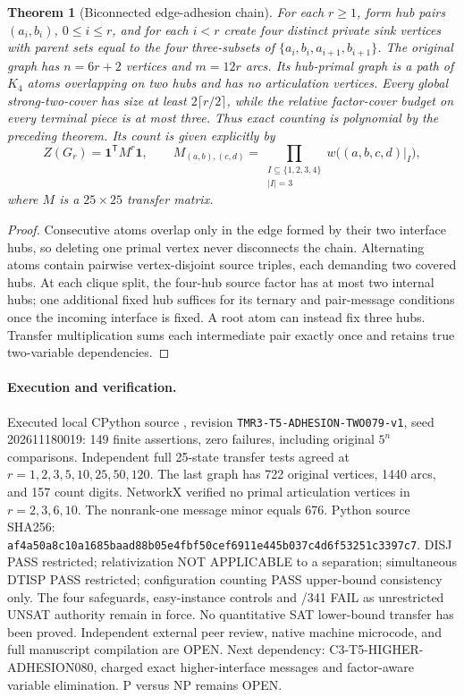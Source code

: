 \documentclass[11pt]{article}
\newtheorem{theorem}{Theorem}
\begin{document}
\begin{theorem}[Biconnected edge-adhesion chain]
For each $r\ge1$, form hub pairs $(a_i,b_i)$,
$0\le i\le r$, and for each $i<r$ create four
distinct private sink vertices with parent sets
equal to the four three-subsets of
$\{a_i,b_i,a_{i+1},b_{i+1}\}$. The original graph has
$n=6r+2$ vertices and $m=12r$ arcs.
Its hub-primal graph is a path of $K_4$ atoms
overlapping on two hubs and has no articulation vertices.
Every global strong-two-cover has size at least
$2\lceil r/2\rceil$, while the relative factor-cover
budget on every terminal piece is at most three.
Thus exact counting is polynomial by the preceding theorem.
Its count is given explicitly by
\[
Z(G_r)=\mathbf1^{\mathsf T}M^r\mathbf1,
\qquad
M_{(a,b),(c,d)}
=\prod_{\substack{I\subseteq\{1,2,3,4\}\\|I|=3}}
w\bigl((a,b,c,d)|_I\bigr),
\]
where $M$ is a $25\times25$ transfer matrix.
\end{theorem}
\begin{proof}
Consecutive atoms overlap only in the edge formed by their
two interface hubs, so deleting one primal vertex never
disconnects the chain. Alternating atoms contain pairwise
vertex-disjoint source triples, each demanding two covered
hubs. At each clique split, the four-hub source factor has
at most two internal hubs; one additional fixed hub suffices
for its ternary and pair-message conditions once the incoming
interface is fixed. A root atom can instead fix three hubs.
Transfer multiplication sums each intermediate pair exactly
once and retains true two-variable dependencies.
\end{proof}

\paragraph{Execution and verification.}
Executed local CPython source
,
revision \texttt{TMR3-T5-ADHESION-TWO079-v1},
seed 202611180019: 149 finite assertions, zero failures,
including original $5^n$ comparisons. Independent full
25-state transfer tests agreed at
$r=1,2,3,5,10,25,50,120$. The last graph has 722
original vertices, 1440 arcs, and 157 count digits.
NetworkX verified no primal articulation vertices in
$r=2,3,6,10$. The nonrank-one message minor equals 676.
Python source SHA256:
\texttt{af4a50a8c10a1685baad88b05e4fbf50cef6911e445b037c4d6f53251c3397c7}.
DISJ PASS restricted; relativization NOT APPLICABLE to
a separation; simultaneous DTISP PASS restricted;
configuration counting PASS upper-bound consistency only.
The four safeguards, easy-instance controls and
/341 FAIL as unrestricted UNSAT authority remain in force.
No quantitative SAT lower-bound transfer has been proved.
Independent external peer review, native machine microcode,
and full manuscript compilation are OPEN.
Next dependency: \textsc{C3-T5-HIGHER-ADHESION080},
charged exact higher-interface messages and
factor-aware variable elimination. P versus NP remains OPEN.
\end{document}
